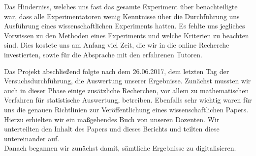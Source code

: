 \documentclass{Bericht}
\begin{document}
Das Hinderniss, welches uns fast das gesamte Experiment über benachteiligte war, dass alle Experimentatoren wenig Kenntnisse über die Durchführung uns Ausführung eines wissenschaftlichen Experiments hatten. Es fehlte uns jegliches Vorwissen zu den Methoden eines Experiments und welche Kriterien zu beachten sind. Dies kostete uns am Anfang viel Zeit, die wir in die online Recherche investierten, sowie für die Absprache mit den erfahrenen Tutoren.

	



 		
		Das Projekt abschließend folgte nach dem 26.06.2017, dem letzten Tag der Versuchsdurchführung, die Auswertung unserer Ergebnisse.
		Zunächst mussten wir auch in dieser Phase einige zusätzliche Recherchen, vor allem zu mathematischen Verfahren für statistische Auswertung, betreiben. Ebenfalls sehr wichtig waren für uns die genauen Richtlinien zur Veröffentlichung eines wissenschaftlichen Papers. Hierzu erhielten wir ein maßgebendes Buch von unseren Dozenten. Wir unterteilten den Inhalt des Papers und dieses Berichts und teilten diese untereinander auf.\\
		Danach begannen wir zunächst damit, sämtliche Ergebnisse zu digitalisieren.

\clearpage


%
\end{document}
